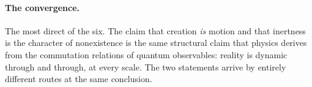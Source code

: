 \paragraph{The convergence.}
The most direct of the six.
The \bahai claim that creation \emph{is} motion and that inertness is the
character of nonexistence is the same structural claim that physics derives
from the commutation relations of quantum observables: reality is dynamic
through and through, at every scale.
The two statements arrive by entirely different routes at the same conclusion.
